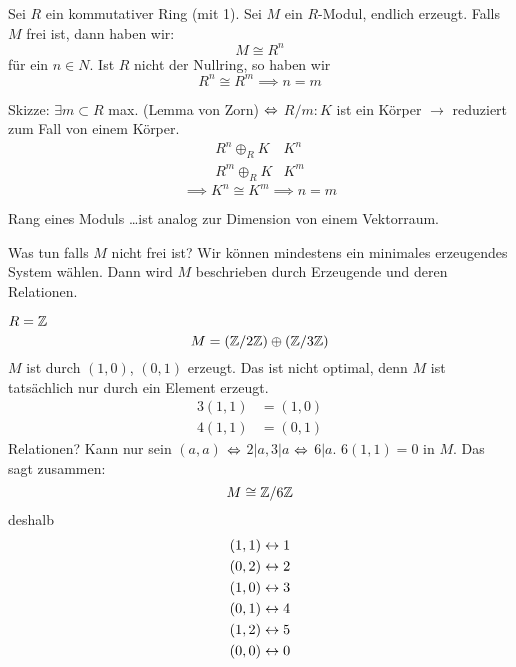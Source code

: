 \begin{Bem}
  Sei $R$ ein kommutativer Ring (mit 1). Sei $M$ ein $R$-Modul, endlich erzeugt. Falls $M$ frei ist, dann haben wir:
  \[M\cong R^n\]
  für ein $n\in N$. Ist $R$ nicht der Nullring, so haben wir
  \[R^n\cong R^m\implies n=m\]
\end{Bem}
\begin{Bew}
  Skizze:
  $\exists m\subset R$ max. (Lemma von Zorn) $\Leftrightarrow$ $R/m:K$ ist ein Körper $\to$ reduziert zum Fall von einem Körper.
  \begin{align*}
    R^n\oplus_R K&K^n\\
    R^m\oplus_R K&K^m
  \end{align*}
  \[\implies K^n\cong K^m\implies n=m\]
\end{Bew}
\begin{Def}{Rang eines Moduls} \ldots ist analog zur Dimension von einem Vektorraum.
\end{Def}
\begin{Bem}
  Was tun falls $M$ nicht frei ist? Wir können mindestens ein minimales erzeugendes System wählen. Dann wird $M$ beschrieben durch Erzeugende und deren Relationen.
\end{Bem}
\begin{Bsp}
  $R=\mathbb{Z}$ 
  \[M=\left( \mathbb{Z}/2\mathbb{Z} \right)\oplus \left( \mathbb{Z}/3\mathbb{Z} \right)\]
  $M$ ist durch $(1,0)$, $(0,1)$ erzeugt. Das ist nicht optimal, denn $M$ ist tatsächlich nur durch ein Element erzeugt.
  \begin{align*}
    3(1,1)&=(1,0)\\
    4(1,1)&=(0,1)
  \end{align*}
  Relationen? Kann nur sein $(a,a)$ $\Leftrightarrow$ $2|a, 3|a$ $\Leftrightarrow$ $6|a$. $6(1,1)=0$ in $M$. Das sagt zusammen:
  \[M\cong \mathbb{Z}/6\mathbb{Z}\]
  deshalb
  \begin{align*}
    (1,1)&\leftrightarrow 1\\
    (0,2)&\leftrightarrow 2\\
    (1,0)&\leftrightarrow 3\\
    (0,1)&\leftrightarrow 4\\
    (1,2)&\leftrightarrow 5\\
    (0,0)&\leftrightarrow 0\\
  \end{align*}
\end{Bsp}
